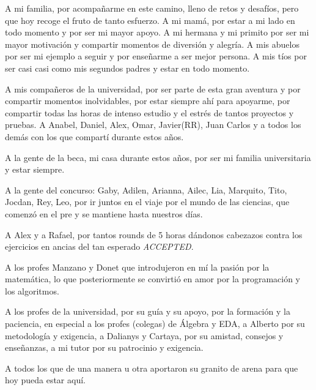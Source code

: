 \begin{acknowledgements}
    A mi familia, por acompañarme en este camino, lleno de retos y desafíos, pero que hoy recoge el fruto de tanto esfuerzo.
    A mi mamá, por estar a mi lado en todo momento y por ser mi mayor apoyo. A mi hermana y mi primito por ser mi mayor motivación y compartir
    momentos de diversión y alegría. A mis abuelos por ser mi ejemplo a seguir y por enseñarme a ser mejor persona.
    A mis tíos por ser casi casi como mis segundos padres y estar en todo momento.
    
    A mis compañeros de la universidad, por ser parte de esta gran aventura y por compartir momentos inolvidables, por 
    estar siempre ahí para apoyarme, por compartir todas las horas de intenso estudio y el estrés de tantos proyectos y pruebas.
    A Anabel, Daniel, Alex, Omar, Javier(RR), Juan Carlos y a todos los demás con los que compartí durante estos años.
    
    A la gente de la beca, mi casa durante estos años, por ser mi familia universitaria y estar siempre.
    
    A la gente del concurso: Gaby, Adilen, Arianna, Ailec, Lia, Marquito, Tito, Jocdan, Rey, Leo,  por ir juntos en el viaje por el mundo de las ciencias, que comenzó en el pre y 
    se mantiene hasta nuestros días. 
    
    A Alex y a Rafael, por tantos rounds de 5 horas dándonos cabezazos contra los ejercicios en ancias del tan esperado 
    \textit{ACCEPTED}.
    
    A los profes Manzano y Donet que introdujeron en mí la pasión por la matemática, lo que posteriormente se convirtió
    en amor por la programación y los algoritmos.
    
    A los profes de la universidad, por su guía y su apoyo, por la formación y la paciencia, en especial a los profes (colegas) de Álgebra y EDA,
    a Alberto por su metodología y exigencia,
    a Dalianys y Cartaya, por su amistad, consejos y enseñanzas, a mi tutor por su patrocinio y exigencia.
    
    A todos los que de una manera u otra aportaron su granito de arena para que hoy pueda estar aquí.
\end{acknowledgements}
